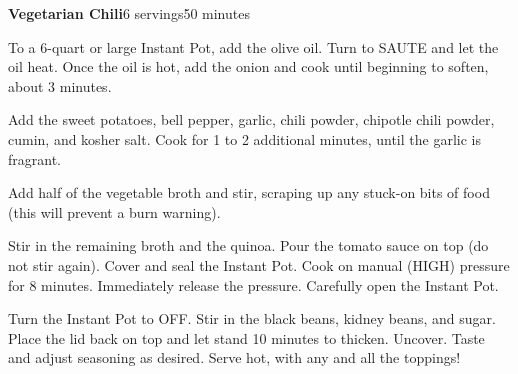 \documentclass[../Cookbook.tex]{subfiles}
\begin{document}
\begin{recipe}[VegetarianChili]{\textbf{Vegetarian Chili}}{6 servings}{50 minutes}

To a 6-quart or large Instant Pot, add the olive oil. Turn to SAUTE and let the oil heat. Once the oil is hot, add the onion and cook until beginning to soften, about 3 minutes.

Add the sweet potatoes, bell pepper, garlic, chili powder, chipotle chili powder, cumin, and kosher salt. Cook for 1 to 2 additional minutes, until the garlic is fragrant.

Add half of the vegetable broth and stir, scraping up any stuck-on bits of food (this will prevent a burn warning). 

Stir in the remaining broth and the quinoa. Pour the tomato sauce on top (do not stir again).
Cover and seal the Instant Pot. Cook on manual (HIGH) pressure for 8 minutes. Immediately release the pressure. Carefully open the Instant Pot.

Turn the Instant Pot to OFF. Stir in the black beans, kidney beans, and sugar. Place the lid back on top and let stand 10 minutes to thicken. Uncover. Taste and adjust seasoning as desired. Serve hot, with any and all the toppings!

\end{recipe}
\end{document}
